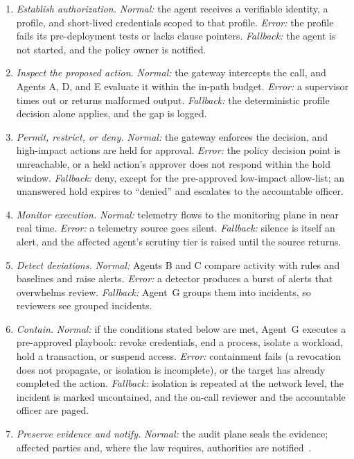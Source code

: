 \documentclass[journal]{IEEEtran}
\begin{document}
\begin{enumerate}
  \item \textit{Establish authorization.} \textit{Normal:} the agent receives a verifiable identity, a profile, and short-lived credentials scoped to that profile. \textit{Error:} the profile fails its pre-deployment tests or lacks clause pointers. \textit{Fallback:} the agent is not started, and the policy owner is notified.
  \item \textit{Inspect the proposed action.} \textit{Normal:} the gateway intercepts the call, and Agents A, D, and E evaluate it within the in-path budget. \textit{Error:} a supervisor times out or returns malformed output. \textit{Fallback:} the deterministic profile decision alone applies, and the gap is logged.
  \item \textit{Permit, restrict, or deny.} \textit{Normal:} the gateway enforces the decision, and high-impact actions are held for approval. \textit{Error:} the policy decision point is unreachable, or a held action's approver does not respond within the hold window. \textit{Fallback:} deny, except for the pre-approved low-impact allow-list; an unanswered hold expires to ``denied'' and escalates to the accountable officer.
  \item \textit{Monitor execution.} \textit{Normal:} telemetry flows to the monitoring plane in near real time. \textit{Error:} a telemetry source goes silent. \textit{Fallback:} silence is itself an alert, and the affected agent's scrutiny tier is raised until the source returns.
  \item \textit{Detect deviations.} \textit{Normal:} Agents B and C compare activity with rules and baselines and raise alerts. \textit{Error:} a detector produces a burst of alerts that overwhelms review. \textit{Fallback:} Agent~G groups them into incidents, so reviewers see grouped incidents.
  \item \textit{Contain.} \textit{Normal:} if the conditions stated below are met, Agent~G executes a pre-approved playbook: revoke credentials, end a process, isolate a workload, hold a transaction, or suspend access. \textit{Error:} containment fails (a revocation does not propagate, or isolation is incomplete), or the target has already completed the action. \textit{Fallback:} isolation is repeated at the network level, the incident is marked uncontained, and the on-call reviewer and the accountable officer are paged.
  \item \textit{Preserve evidence and notify.} \textit{Normal:} the audit plane seals the evidence; affected parties and, where the law requires, authorities are notified~\cite{euaiact2024,nist2025incident}.

\end{enumerate}
\end{document}
